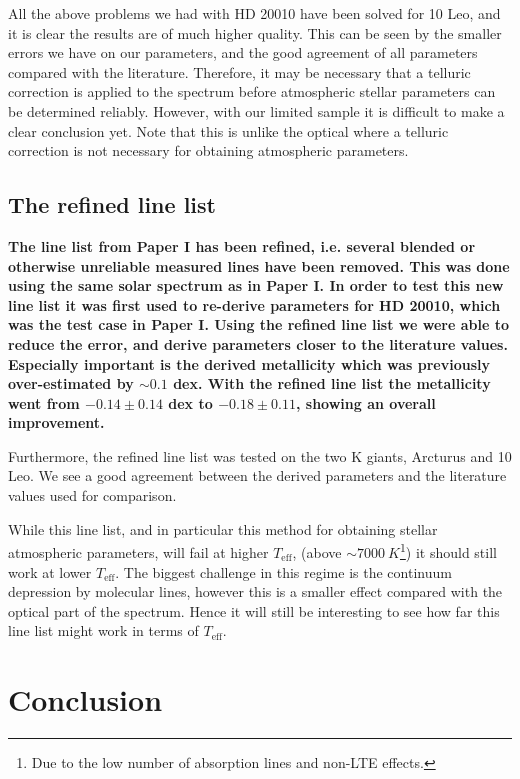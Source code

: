 \documentclass{aa}
\begin{document}
All the above problems we had with HD 20010 have been solved for 10 Leo, and it
is clear the results are of much higher quality. This can be seen by the smaller
errors we have on our parameters, and the good agreement of all parameters
compared with the literature. Therefore, it may be necessary that a telluric
correction is applied to the spectrum before atmospheric stellar parameters can
be determined reliably. However, with our limited sample it is difficult to make
a clear conclusion yet. Note that this is unlike the optical where a telluric
correction is not necessary for obtaining atmospheric parameters.


\subsection{The refined line list}

{\bf The line list from Paper I has been refined, i.e. several blended or
otherwise unreliable measured lines have been removed. This was done using the
same solar spectrum as in Paper I. In order to test this new line list it was
first used to re-derive parameters for HD 20010, which was the test case in
Paper I. Using the refined line list we were able to reduce the error, and
derive parameters closer to the literature values. Especially important is the
derived metallicity which was previously over-estimated by $\sim0.1$ dex. With
the refined line list the metallicity went from $-0.14\pm0.14$ dex to
$-0.18\pm0.11$, showing an overall improvement.

Furthermore, the refined line list was tested on the two K giants, Arcturus and
10 Leo. We see a good agreement between the derived parameters and the
literature values used for comparison.

While this line list, and in particular this method for obtaining stellar
atmospheric parameters, will fail at higher $T_\mathrm{eff}$, (above
$\sim\SI{7000}{K}$\footnote{Due to the low number of absorption lines and
non-LTE effects.}) it should still work at lower $T_\mathrm{eff}$. The biggest
challenge in this regime is the continuum depression by molecular lines, however
this is a smaller effect compared with the optical part of the spectrum. Hence
it will still be interesting to see how far this line list might work in terms
of $T_\mathrm{eff}$.}



\section{Conclusion}
\label{sec:conclusion}
\end{document}
